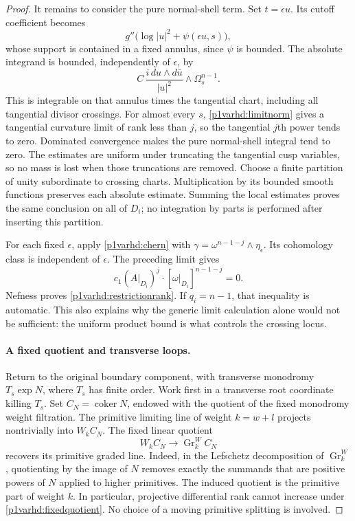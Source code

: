 \begin{proof}
It remains to consider the pure normal-shell term.  Set
$t=\epsilon u$.  Its cutoff coefficient becomes
\[
 g''\bigl(\log|u|^2+\psi(\epsilon u,s)\bigr),
\]
whose support is contained in a fixed annulus, since $\psi$ is
bounded.  The absolute integrand is bounded, independently of
$\epsilon$, by
\[
 C\,\frac{i\,du\wedge d\bar u}{|u|^2}
            \wedge\Omega_s^{n-1}.
\]
This is integrable on that annulus times the tangential chart,
including all tangential divisor crossings.  For almost every $s$,
\eqref{p1varhd:limitnorm} gives a tangential curvature limit of rank
less than $j$, so the tangential $j$th power tends to zero.
Dominated convergence makes the pure normal-shell integral tend
to zero.  The estimates are uniform under truncating the
tangential cusp variables, so no mass is lost when those
truncations are removed.  Choose a finite partition of unity subordinate to crossing charts.
Multiplication by its bounded smooth functions preserves each absolute
estimate.  Summing the local estimates proves the same conclusion on
all of $D_i$; no integration by parts is performed after inserting this
partition.

For each fixed $\epsilon$, apply \eqref{p1varhd:chern} with
$\gamma=\omega^{n-1-j}\wedge\eta_\epsilon$.  Its cohomology
class is independent of $\epsilon$.  The preceding limit gives
\[
 c_1(A|_{D_i})^j\cdot[\omega|_{D_i}]^{n-1-j}=0.
\]
Nefness proves \eqref{p1varhd:restrictionrank}.  If $q_i=n-1$, that
inequality is automatic.  This also explains why the generic
limit calculation alone would not be sufficient: the uniform
product bound is what controls the crossing locus.

\paragraph{A fixed quotient and transverse loops.}
Return to the original boundary component, with transverse
monodromy $T_s\exp N$, where $T_s$ has finite order.  Work first
in a transverse root coordinate killing $T_s$.  Set
$C_N=\operatorname{coker}N$, endowed with the quotient of the
fixed monodromy weight filtration.  The primitive limiting line
of weight $k=w+l$ projects nontrivially into $W_kC_N$.
The fixed linear quotient
\begin{equation}\label{p1varhd:fixedquotient}
              W_kC_N\longrightarrow\operatorname{Gr}^W_k C_N
\end{equation}
recovers its primitive graded line.  Indeed, in the Lefschetz
decomposition of $\operatorname{Gr}^W_k$, quotienting by the
image of $N$ removes exactly the summands that are positive powers
of $N$ applied to higher primitives.  The induced quotient is the
primitive part of weight $k$.  In particular, projective
differential rank cannot increase under \eqref{p1varhd:fixedquotient}.
No choice of a moving primitive splitting is involved.


\end{proof}
